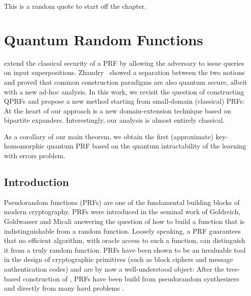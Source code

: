 \begin{savequote}[75mm]
This is a random quote to start off the chapter.
\end{savequote}

\chapter{Quantum Random Functions}

 extend the classical security of a PRF by allowing the adversary to issue queries on input superpositions. Zhandry~\cite{FOCS:Zhandry12} showed a separation between the two notions and proved that common construction paradigms are also quantum secure, albeit with a new ad-hoc analysis. In this work, we revisit the question of constructing QPRFs and propose a new method starting from small-domain (classical) PRFs: At the heart of our approach is a new domain-extension technique based on bipartite expanders. Interestingly, our analysis is almost entirely classical.

As a corollary of our main theorem, we obtain the first (approximate) key-homomorphic quantum PRF based on the quantum intractability of the learning with errors problem.

\section{Introduction}
Pseudorandom functions (PRFs) are one of the fundamental building blocks of modern cryptography. PRFs were introduced in the seminal work of Goldreich, Goldwasser and Micali \cite{FOCS:GolGolMic84} answering the question of how to build a function that is indistinguishable from a random function. Loosely speaking, a PRF guarantees that no efficient algorithm, with oracle access to such a function, can distinguish it from a truly random function. PRFs have been shown to be an invaluable tool in the design of cryptographic primitives (such as block ciphers and message authentication codes) and are by now a well-understood object: After the tree-based construction of \cite{FOCS:GolGolMic84}, PRFs have been build from pseudorandom synthesizers \cite{FOCS:NaoRei95} and directly from many hard problems \cite{FOCS:NaoRei97,STOC:NaoRei97,STOC:NaoReiRos00,PKC:DodYam05,CCS:LewWat09,CCS:BonMonRag10,EC:BanPeiRos12}.

